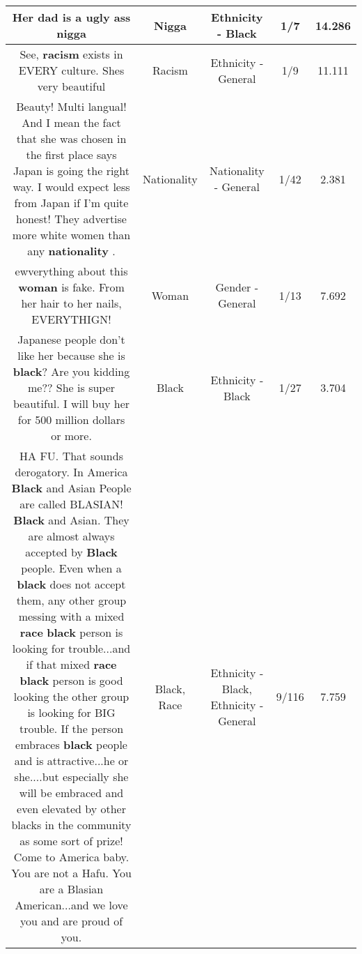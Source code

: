 \documentclass[11pt]{article}
\newlength\mylength
\begin{document}
\begin{center}
\begin{longtable}{|C{.65\mylength}|C{.30\mylength}|C{.12\mylength}|C{.12\mylength}|C{.12\mylength}|}
  \small Her dad is a ugly ass nigga\normalsize   & Nigga & Ethnicity - Black & 1/7 & 14.286 \\  \hline
  \small See, \textbf{racism} exists in EVERY culture. Shes very beautiful\normalsize   & Racism & Ethnicity - General & 1/9 & 11.111 \\  \hline
  \small Beauty! Multi langual! And I mean the fact that she was chosen in the first place says Japan is going the right way. I would expect less from Japan if I'm quite honest! They advertise more white women than any \textbf{nationality} .\normalsize   & Nationality & Nationality - General & 1/42 & 2.381 \\  \hline
  \small ewverything about this \textbf{woman} is fake. From her hair to her nails, EVERYTHIGN!\normalsize   & Woman & Gender - General & 1/13 & 7.692 \\  \hline
  \small Japanese people don't like her because she is \textbf{black}? Are you kidding me?? She is super beautiful. I will buy her for 500 million dollars or more.\normalsize   & Black & Ethnicity - Black & 1/27 & 3.704 \\  \hline
  \small HA FU. That sounds derogatory. In America \textbf{Black} and Asian People are called BLASIAN! \textbf{Black} and Asian. They are almost always accepted by \textbf{Black} people.  Even when a \textbf{black} does not accept them, any other group messing with a mixed \textbf{race} \textbf{black} person is looking for trouble...and if that mixed \textbf{race} \textbf{black} person is good looking the other group is looking for BIG trouble. If the person embraces \textbf{black} people and is attractive...he or she....but especially she will be embraced and even elevated by other blacks in the community as some sort of prize! Come to America baby. You are not a Hafu. You are a Blasian American...and we love you and are proud of you.\normalsize   & Black, Race & Ethnicity - Black, Ethnicity - General & 9/116 & 7.759 \\  \hline

\end{longtable}
\end{center}
\end{document}

